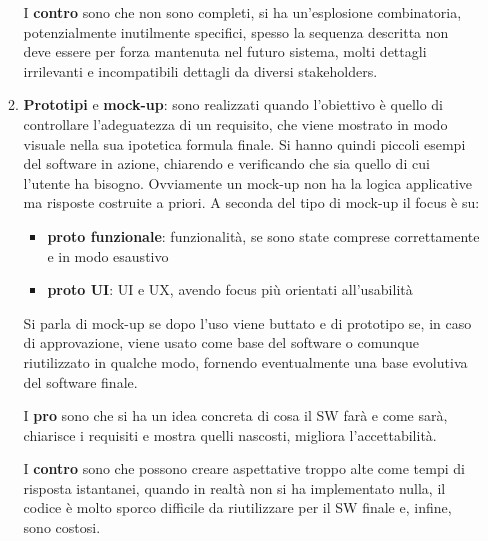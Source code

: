 \begin{itemize}
\begin{enumerate}
                        I \textbf{contro} sono che non sono completi, 
                        si ha un'esplosione combinatoria, potenzialmente 
                        inutilmente specifici, spesso la sequenza descritta non 
                        deve essere per forza mantenuta nel futuro sistema, 
                        molti dettagli irrilevanti e incompatibili dettagli da 
                        diversi stakeholders.
                  \item \textbf{Prototipi} e \textbf{mock-up}: sono realizzati quando
                        l'obiettivo è quello di controllare l'adeguatezza di un requisito, che
                        viene mostrato in modo visuale nella sua ipotetica formula finale. Si
                        hanno quindi piccoli esempi del software in azione, chiarendo e verificando
                        che sia quello di cui l'utente ha bisogno. Ovviamente un mock-up non ha
                        la logica applicative ma risposte costruite a priori. A seconda del tipo
                        di mock-up il focus è su:
                        \begin{itemize}
                              \item \textbf{proto funzionale}: funzionalità, se sono state comprese correttamente e in modo
                                    esaustivo
                              \item \textbf{proto UI}: UI e UX, avendo focus più orientati all'usabilità
                        \end{itemize}
                        Si parla di mock-up se dopo l'uso viene buttato e di prototipo se, in caso
                        di approvazione, viene usato come base del software o comunque riutilizzato
                        in qualche modo, fornendo eventualmente una base evolutiva del software finale.

                        I \textbf{pro} sono che si ha un idea concreta di cosa 
                        il SW farà e come sarà, chiarisce i requisiti e mostra 
                        quelli nascosti, migliora l'accettabilità.

                        I \textbf{contro} sono che possono creare aspettative troppo 
                        alte come tempi di risposta istantanei, quando in realtà 
                        non si ha implementato nulla, il codice è molto sporco
                        difficile da riutilizzare per il SW finale e, infine, sono costosi.


\end{enumerate}
\end{itemize}

